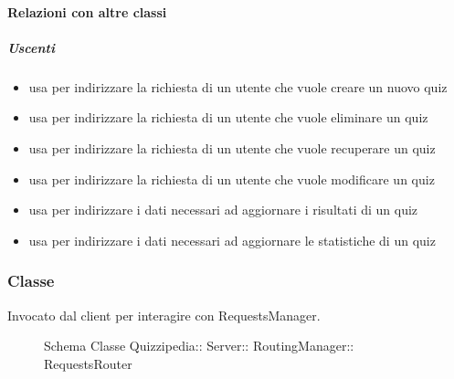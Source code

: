 \paragraph{Relazioni con altre classi}
\subparagraph{Uscenti}
\begin{itemize}
\item usa  per indirizzare la richiesta di un utente che vuole creare un nuovo quiz
\item usa  per indirizzare la richiesta di un utente che vuole eliminare un quiz
\item usa  per indirizzare la richiesta di un utente che vuole recuperare un quiz
\item usa  per indirizzare la richiesta di un utente che vuole modificare un quiz
\item usa  per indirizzare i dati necessari ad aggiornare i risultati di un quiz
\item usa  per indirizzare i dati necessari ad aggiornare le statistiche di un quiz
\end{itemize}
\subsubsection{Classe }
Invocato dal client per interagire con RequestsManager.
\begin{figure}[H]
\centering
\noindent{}
\caption[Schema Classe RequestsRouter]{Schema Classe Quizzipedia:: Server:: RoutingManager:: RequestsRouter}
\end{figure}
